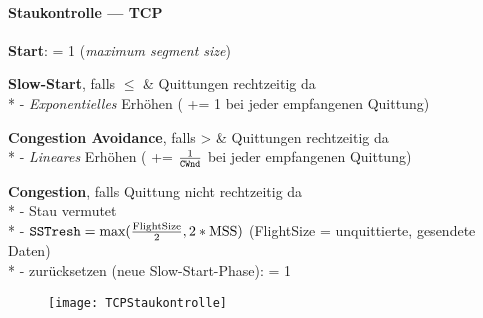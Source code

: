 \paragraph{Staukontrolle --- TCP}
\begin{items}
  \item \textbf{Start}:  = 1  (\emph{maximum segment size})
  \item \textbf{Slow-Start}, falls  \( \leq \)  \& Quittungen rechtzeitig da \\*
    - \emph{Exponentielles} Erhöhen  ( += 1 bei jeder empfangenen Quittung)
  \item \textbf{Congestion Avoidance}, falls  >  \& Quittungen rechtzeitig da \\*
    - \emph{Lineares} Erhöhen  ( += \( \tfrac{1}{\text{\code{CWnd}}} \) bei jeder empfangenen Quittung)
  \item \textbf{Congestion}, falls Quittung nicht rechtzeitig da \\*
    - Stau vermutet \\*
    - \( \text{\code{SSTresh}} = \text{max}(\tfrac{\text{FlightSize}}{2}, 2*\text{MSS}) \) (FlightSize = unquittierte, gesendete Daten) \\*
    -  zurücksetzen (neue Slow-Start-Phase):  = 1 
\end{items}
\begin{figure}[H]\centering\label{TCPStaukontrolle}\texttt{[image: TCPStaukontrolle]}\end{figure}